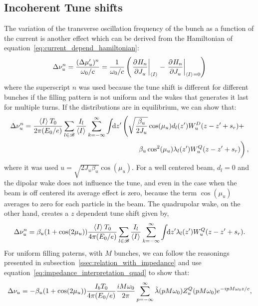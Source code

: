 \subsection{Incoherent Tune shifts}\label{sec:incoherent_tune_shift}

    The variation of the transverse oscillation frequency of the bunch as a function of the current is another effect which can be derived from the Hamiltonian of equation~\eqref{eq:current_depend_hamiltonian}:
    \begin{align}
        \Delta\nu_u^n = \frac{(\Delta\mu'_u)^n}{\omega_0/c} = \frac{1}{\omega_0/c}\left(\left.\frac{\partial^{{}}H_n}{\partial J_u^{{}}}\right|_{\left\langle I \right\rangle_{{}}} - \left.\frac{\partial^{{}}H_n}{\partial J_u^{{}}}\right|_{\left\langle I \right\rangle_{{}}=0}\right)
    \end{align}
    where the superscript $n$ was used because the tune shift is different for different bunches if the filling pattern is not uniform and the wakes that generates it last for multiple turns. If the distributions are in equilibrium, we can show that:
    \begin{align}
        \Delta\nu_u^n = \frac{\average{I}T_0}{2\pi(E_0/e)}
        \sum_{l\in\mathscr{B}}\frac{I_l}{\average{I}}\sum_{k=-\infty}^\infty\udefint{z'}{
        &\left(\sqrt{\frac{\beta_u}{2J_u}}\cos(\mu_u)d_l(z') W^D_u(z-z' + s_r) +\right.\\
        &\left.\phantom{\sqrt{\frac{1_1}{1_1}}}\beta_u\cos^2(\mu_u)\lambda_l(z') W^Q_u(z-z' + s_r)\right)},
    \end{align}
    where it was used $u = \sqrt{2J_u\beta_u}\cos(\mu_u)$. For a well centered beam, $d_l=0$ and the dipolar wake does not influence the tune, and even in the case when the beam is off centered its average effect is zero, because the term $\cos(\mu_u)$ averages to zero for each particle in the beam. The quadrupolar wake, on the other hand, creates a $z$ dependent tune shift given by,
    \begin{align}
        \Delta\nu_u^n = \beta_u(1+\cos(2\mu_u))\frac{\left\langle I \right\rangle_{{}}T_0}{4\pi(E_0/e)}
        \sum_{l\in\mathscr{B}}\frac{I_l}{\left\langle I \right\rangle_{{}}}\sum_{k=-\infty}^\infty\int\!\!\text{d}z' 
        \lambda_l(z') W^Q_u(z-z' + s_r).
    \end{align}
    For uniform filling paterns, with $M$ bunches, we can follow the reasonings presented in subsection~\ref{ssec:relation_with_impedance} and use equation~\eqref{eq:impedance_interpretation_quad} to show that:
    \begin{align}
        \Delta\nu_u = -\beta_u(1+\cos(2\mu_u))\frac{I_bT_0}{4\pi(E_0/e)}
        \frac{iM\omega_0}{2\pi} \sum_{p=-\infty}^\infty \tilde{\lambda}(pM\omega_0)Z^Q_u(pM\omega_0)e^{-ipM\omega_0 z/c},
    \end{align}
